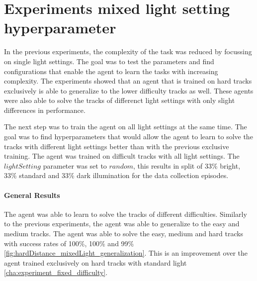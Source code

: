 
\section{Experiments mixed light setting hyperparameter}
\label{cha:experiment_mixed_light}

In the previous experiments, the complexity of the task was reduced by focussing on single light settings. The goal was to test the parameters and find configurations that enable the agent to learn the tasks with increasing complexity. The experiments showed that an agent that is trained on hard tracks exclusively is able to generalize to the lower difficulty tracks as well. These agents were also able to solve the tracks of differenct light settings with only slight differences in performance.


The next step was to train the agent on all light settings at the same time. The goal was to find hyperparameters that would allow the agent to learn to solve the tracks with different light settings better than with the previous exclusive training. The agent was trained on difficult tracks with all light settings. The $lightSetting$ parameter was set to $random$, this results in split of 33\% bright, 33\% standard and 33\% dark illumination for the data collection episodes.

\paragraph{General Results}
The agent was able to learn to solve the tracks of different difficulties. Similarly to the previous experiments, the agent was able to generalize to the easy and medium tracks. The agent was able to solve the easy, medium and hard tracks with success rates of 100\%, 100\% and 99\% \ref{fig:hardDistance_mixedLight_generalization}. This is an improvement over the agent trained exclusively on hard tracks with standard light \ref{cha:experiment_fixed_difficulty}.


